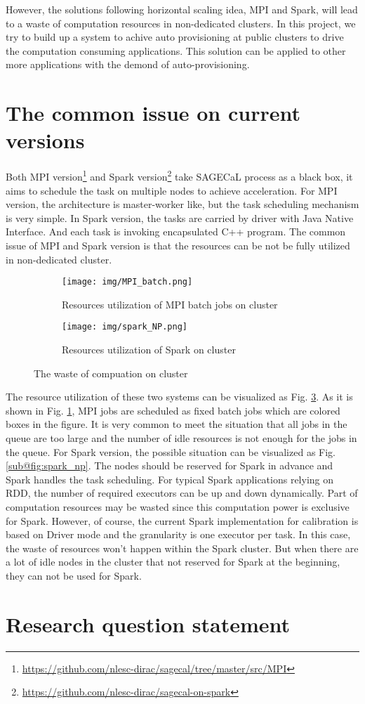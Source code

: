 \documentclass[sigchi]{acmart}
\begin{document}
However, the solutions following horizontal scaling idea, MPI and Spark, will lead to a waste of computation resources in non-dedicated clusters.
In this project, we try to build up a system to achive auto provisioning at public clusters to drive the computation consuming applications. This solution can be applied to other more applications with the demond of auto-provisioning.

\section{The common issue on current versions}
Both MPI version\footnote{\url{https://github.com/nlesc-dirac/sagecal/tree/master/src/MPI}} and Spark version\footnote{\url{https://github.com/nlesc-dirac/sagecal-on-spark}} take SAGECaL process as a black box, it aims to schedule the task on multiple nodes to achieve acceleration. 
For MPI version, the architecture is master-worker like, but the task scheduling mechanism is very simple. In Spark version, the tasks are carried by driver with Java Native Interface. And each task is invoking encapsulated C++ program.
The common issue of MPI and Spark version is that the resources can be not be fully utilized in non-dedicated cluster. 

\begin{figure}[h!]
  \begin{subfigure}[b]{0.45\textwidth}
      \texttt{[image: img/MPI\_batch.png]}
      \caption{Resources utilization of MPI batch jobs on cluster}
      \label{fig:MPI_batch}
  \end{subfigure}
  \begin{subfigure}[b]{0.45\textwidth}
      \texttt{[image: img/spark\_NP.png]}
      \caption{Resources utilization of Spark on cluster}
      \label{fig:spark_np}
  \end{subfigure}
  \caption{The waste of compuation on cluster}\label{fig:waste_cluster}
\end{figure}
The resource utilization of these two systems can be visualized as Fig. \ref{fig:waste_cluster}. As it is shown in Fig. \ref{fig:MPI_batch}, MPI jobs are scheduled as fixed batch jobs which are colored boxes in the figure. It is very common to meet the situation that all jobs in the queue are too large and the number of idle resources is not enough for the jobs in the queue. 
For Spark version, the possible situation can be visualized as Fig. \ref{sub@fig:spark_np}. The nodes should be reserved for Spark in advance and Spark handles the task scheduling. For typical Spark applications relying on RDD, the number of required executors can be up and down dynamically. Part of computation resources may be wasted since this computation power is exclusive for Spark.
However, of course, the current Spark implementation for calibration is based on Driver mode and the granularity is one executor per task. In this case, the waste of resources won't happen within the Spark cluster. But when there are a lot of idle nodes in the cluster that not reserved for Spark at the beginning, they can not be used for Spark. 


\section{Research question statement}
 


\end{document}
